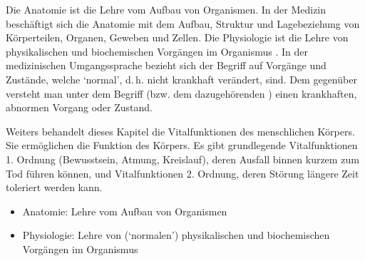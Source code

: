 { %
Die Anatomie ist die Lehre vom Aufbau von Organismen.
%
In der Medizin beschäftigt sich die Anatomie mit dem 
Aufbau, 
Struktur 
und Lagebeziehung 
von Körperteilen, Organen, Geweben und Zellen.
%
Die Physiologie ist die Lehre von physikalischen 
und biochemischen Vorgängen 
im Organismus%
%
. 
%
In der medizinischen Umgangssprache bezieht sich der Begriff  
auf 
Vorgänge 
und Zustände, 
welche \enquote*{normal},
 d.\,h. nicht krankhaft verändert, 
 sind. 
%
Dem gegenüber versteht man unter dem Begriff  
(bzw. dem dazugehörenden ) 
einen krankhaften, abnormen Vorgang oder Zustand. 


Weiters behandelt dieses Kapitel die Vitalfunktionen
des menschlichen Körpers. 
%
Sie ermöglichen die Funktion des
Körpers. Es gibt grundlegende Vitalfunktionen 1. Ordnung
(Bewusstsein, Atmung, Kreislauf), deren Ausfall binnen
kurzem zum Tod führen können, und Vitalfunktionen 2.
Ordnung, deren
Störung längere Zeit toleriert werden kann.
}
{
\begin{itemize}
  \item Anatomie: 
  Lehre vom Aufbau von Organismen
  \item Physiologie: 
  Lehre von (\enquote*{normalen})
  physikalischen 
  und biochemischen Vorgängen 
  im Organismus
\end{itemize}
}






